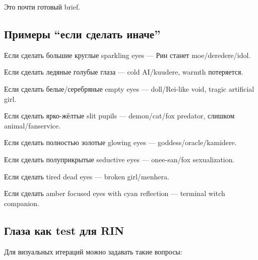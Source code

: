 Это почти готовый brief.

\subsection*{Примеры ``если сделать иначе''}

Если сделать большие круглые sparkling eyes --- Рин станет
moe/\hspace{0pt}deredere/\hspace{0pt}idol.

Если сделать ледяные голубые глаза --- cold AI/\hspace{0pt}kuudere, warmth
потеряется.

Если сделать белые/\hspace{0pt}серебряные empty eyes --- doll/\hspace{0pt}Rei-like void, tragic
artificial girl.

Если сделать ярко-жёлтые slit pupils --- demon/\hspace{0pt}cat/\hspace{0pt}fox predator, слишком
animal/\hspace{0pt}fanservice.

Если сделать полностью золотые glowing eyes --- goddess/\hspace{0pt}oracle/\hspace{0pt}kamidere.

Если сделать полуприкрытые seductive eyes --- onee-san/\hspace{0pt}fox
sexualization.

Если сделать tired dead eyes --- broken girl/\hspace{0pt}menhera.

Если сделать amber focused eyes with cyan reflection --- terminal witch
companion.

\subsection*{Глаза как test для RIN}

Для визуальных итераций можно задавать такие вопросы:

